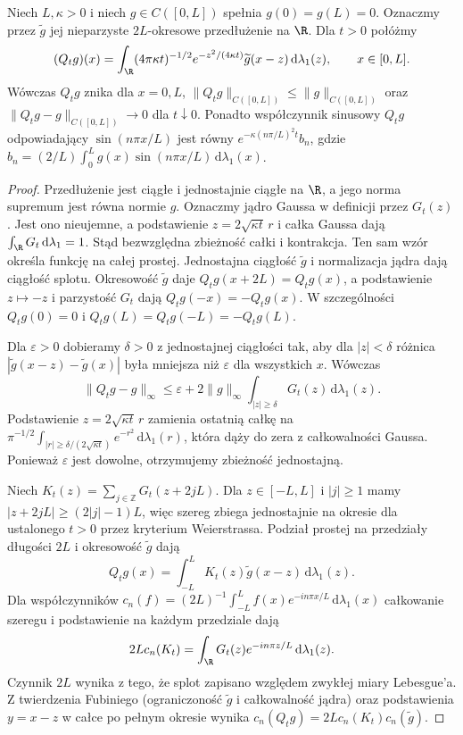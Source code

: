 \begin{lemat}
\label{lem:pde6-dirichlet-heat}
Niech $L,\kappa>0$ i niech
$g\in C([0,L])$ spełnia $g(0)=g(L)=0$.
Oznaczmy przez $\widetilde g$ jej nieparzyste
$2L$-okresowe przedłużenie na $\R$. Dla $t>0$ połóżmy
\[
 (Q_tg)(x)=\int_{\R}(4\pi\kappa t)^{-1/2}
 e^{-z^2/(4\kappa t)}\widetilde g(x-z)
 \,\mathrm d\lambda_1(z),\qquad x\in[0,L].
\]
Wówczas $Q_tg$ znika dla $x=0,L$,
$\|Q_tg\|_{C([0,L])}\le\|g\|_{C([0,L])}$ oraz
$\|Q_tg-g\|_{C([0,L])}\to0$ dla $t\downarrow0$.
Ponadto współczynnik sinusowy $Q_tg$ odpowiadający
$\sin(n\pi x/L)$ jest równy
$e^{-\kappa(n\pi/L)^2t}b_n$, gdzie
$b_n=(2/L)\int_0^Lg(x)\sin(n\pi x/L)\,\mathrm d\lambda_1(x)$.
\end{lemat}
\begin{proof}
Przedłużenie jest ciągłe i jednostajnie ciągłe na $\R$,
a jego norma supremum jest równa normie $g$.
Oznaczmy jądro Gaussa w definicji przez $G_t(z)$.
Jest ono nieujemne, a podstawienie $z=2\sqrt{\kappa t}\,r$
i całka Gaussa dają $\int_{\R}G_t\,\mathrm d\lambda_1=1$.
Stąd bezwzględna zbieżność całki i kontrakcja.
Ten sam wzór określa funkcję na całej prostej.
Jednostajna ciągłość $\widetilde g$ i normalizacja jądra
dają ciągłość splotu. Okresowość $\widetilde g$ daje
$Q_tg(x+2L)=Q_tg(x)$, a podstawienie $z\mapsto-z$
i parzystość $G_t$ dają $Q_tg(-x)=-Q_tg(x)$.
W szczególności $Q_tg(0)=0$ i
$Q_tg(L)=Q_tg(-L)=-Q_tg(L)$.

Dla $\varepsilon>0$ dobieramy $\delta>0$ z jednostajnej
ciągłości tak, aby dla $|z|<\delta$ różnica
$|\widetilde g(x-z)-\widetilde g(x)|$ była mniejsza
niż $\varepsilon$ dla wszystkich $x$. Wówczas
\[
 \|Q_tg-g\|_\infty\le\varepsilon+2\|g\|_\infty
 \int_{|z|\ge\delta}G_t(z)\,\mathrm d\lambda_1(z).
\]
Podstawienie $z=2\sqrt{\kappa t}\,r$ zamienia ostatnią
całkę na $\pi^{-1/2}\int_{|r|\ge\delta/(2\sqrt{\kappa t})}
e^{-r^2}\,\mathrm d\lambda_1(r)$, która dąży do zera
z całkowalności Gaussa. Ponieważ $\varepsilon$ jest
dowolne, otrzymujemy zbieżność jednostajną.

Niech $K_t(z)=\sum_{j\in\mathbb Z}G_t(z+2jL)$.
Dla $z\in[-L,L]$ i $|j|\ge1$ mamy
$|z+2jL|\ge(2|j|-1)L$, więc szereg zbiega jednostajnie
na okresie dla ustalonego $t>0$ przez kryterium Weierstrassa.
Podział prostej na przedziały długości $2L$ i okresowość
$\widetilde g$ dają
\[
 Q_tg(x)=\int_{-L}^L K_t(z)\widetilde g(x-z)\,
 \mathrm d\lambda_1(z).
\]
Dla współczynników $c_n(f)=(2L)^{-1}
\int_{-L}^L f(x)e^{-in\pi x/L}\,\mathrm d\lambda_1(x)$
całkowanie szeregu i podstawienie na każdym przedziale dają
\[
 2L c_n(K_t)=\int_{\R}G_t(z)e^{-in\pi z/L}\,
 \mathrm d\lambda_1(z).
\]
Czynnik $2L$ wynika z tego, że splot zapisano względem
zwykłej miary Lebesgue'a. Z twierdzenia Fubiniego
(ograniczoność $\widetilde g$ i całkowalność jądra)
oraz podstawienia $y=x-z$ w całce po pełnym okresie
wynika $c_n(Q_tg)=2L c_n(K_t)c_n(\widetilde g)$.


\end{proof}
